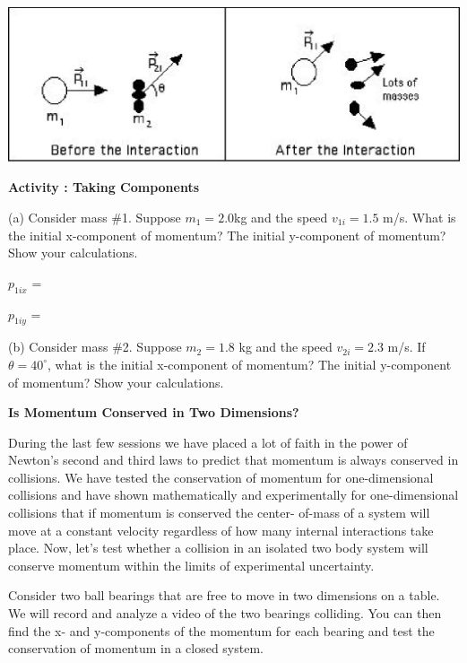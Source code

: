 \vspace{0.3cm}
{\par\centering \includegraphics{2Dcollisions/twod_collisions_fig3.eps} \par}
\vspace{0.3cm}

\newpage

\textbf{Activity  : Taking Components }

(a) Consider mass \#1. Suppose \( m_{1}  = 2.0 \)kg and the speed \( v_{1i} 
= 1.5 \) m/s. What is the initial x-component of momentum? The initial y-component
of momentum? Show your calculations.
\vspace{5mm}

\( p_{1ix} \) = 
\vspace{5mm}

\( p_{1iy} \) = 
\vspace{5mm}

(b) Consider mass \#2. Suppose \( m_{2}  = 1.8 \) kg and the speed 
\( v_{2i} 
= 2.3 \) m/s. If \( \theta   = 40^{\circ } \), what is the initial x-component
of momentum? The initial y-component of momentum? Show your calculations.
\vspace{20mm}

\textbf{Is Momentum Conserved in Two Dimensions? }

During the last few sessions we have placed a lot of faith in the power of Newton's
second and third laws to predict that momentum is always conserved in collisions.
We have tested the conservation of momentum for one-dimensional collisions and
have shown mathematically and experimentally for one-dimensional collisions
that if momentum is conserved the center- of-mass of a system will move at a
constant velocity regardless of how many internal interactions take place. Now,
let's test whether a collision in an isolated two body system will conserve
momentum within the limits of experimental uncertainty. 

Consider two ball bearings that are free to move in two dimensions on a table.
We will record and analyze a video of the two bearings colliding. You can then
find the x- and y-components of the momentum for each bearing and test the conservation
of momentum in a closed system. 

